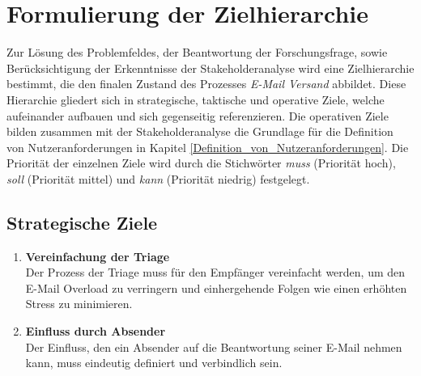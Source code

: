 
\chapter{Formulierung der Zielhierarchie}
\label{Formulierung_der_Zielhierarchie}

Zur Lösung des Problemfeldes, der Beantwortung der Forschungsfrage, sowie Berücksichtigung der Erkenntnisse der Stakeholderanalyse wird eine Zielhierarchie bestimmt, die den finalen Zustand des Prozesses \textit{E-Mail Versand} abbildet. Diese Hierarchie gliedert sich in strategische, taktische und operative Ziele, welche aufeinander aufbauen und sich gegenseitig referenzieren. Die operativen Ziele bilden zusammen mit der Stakeholderanalyse die Grundlage für die Definition von Nutzeranforderungen in Kapitel \ref{Definition_von_Nutzeranforderungen}. Die Priorität der einzelnen Ziele wird durch die Stichwörter \textit{muss} (Priorität hoch), \textit{soll} (Priorität mittel) und \textit{kann} (Priorität niedrig) festgelegt.


\section{Strategische Ziele}
\begin{enumerate}[label=(\alph*)]
    \item \textbf{Vereinfachung der Triage}\\
        Der Prozess der Triage muss für den Empfänger vereinfacht werden, um den E-Mail Overload zu verringern und einhergehende Folgen wie einen erhöhten Stress zu minimieren.
        
    \item \textbf{Einfluss durch Absender}\\
        Der Einfluss, den ein Absender auf die Beantwortung seiner E-Mail nehmen kann, muss eindeutig definiert und verbindlich sein.
\end{enumerate}


